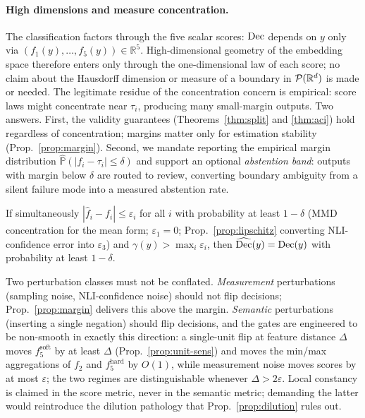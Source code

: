 \paragraph{High dimensions and measure concentration.} The classification
factors through the five scalar scores: $\mathrm{Dec}$ depends on $y$ only via
$(f_1(y),\dots,f_5(y))\in\mathbb R^5$. High-dimensional geometry of the
embedding space therefore enters only through the one-dimensional law of each
score; no claim about the Hausdorff dimension or measure of a boundary in
$\mathcal{P}(\mathbb{R}^d)$ is made or needed. The legitimate residue of the concentration concern
is empirical:
score laws might concentrate near $\tau_i$, producing many small-margin
outputs. Two answers. First, the validity guarantees
(Theorems~\ref{thm:split} and \ref{thm:aci}) hold regardless of
concentration; margins matter only for estimation stability
(Prop.~\ref{prop:margin}). Second, we mandate reporting the empirical margin
distribution $\hat{\mathbb P}(|f_i-\tau_i|\le\delta)$ and support an optional
\emph{abstention band}: outputs with margin below $\delta$ are routed to
review, converting boundary ambiguity from a silent failure mode into a
measured abstention rate.

\begin{proposition}
\label{prop:margin}
If simultaneously $|\hat f_i-f_i|\le\varepsilon_i$ for all $i$ with
probability at least $1-\delta$ (MMD concentration for the mean form;
$\varepsilon_1=0$; Prop.~\ref{prop:lipschitz} converting NLI-confidence error
into $\varepsilon_3$) and $\gamma(y)>\max_i\varepsilon_i$, then
$\widehat{\mathrm{Dec}}(y)=\mathrm{Dec}(y)$ with probability at least $1-\delta$.
\end{proposition}

\begin{remark}
Two perturbation classes must not be conflated. \emph{Measurement}
perturbations (sampling noise, NLI-confidence noise) should not flip
decisions; Prop.~\ref{prop:margin} delivers this above the margin.
\emph{Semantic} perturbations (inserting a single negation) should flip
decisions, and the gates are engineered to be non-smooth in exactly this
direction: a single-unit flip at feature distance $\Delta$ moves
$f_5^{\mathrm{soft}}$ by at least $\Delta$ (Prop.~\ref{prop:unit-sens}) and
moves the min/max aggregations of $f_2$ and $f_5^{\mathrm{hard}}$ by $O(1)$,
while measurement noise moves scores by at most $\varepsilon$; the two regimes
are distinguishable whenever $\Delta>2\varepsilon$. Local constancy is claimed
in the score metric, never in the semantic metric; demanding the latter would
reintroduce the dilution pathology that Prop.~\ref{prop:dilution} rules out.
\end{remark}

